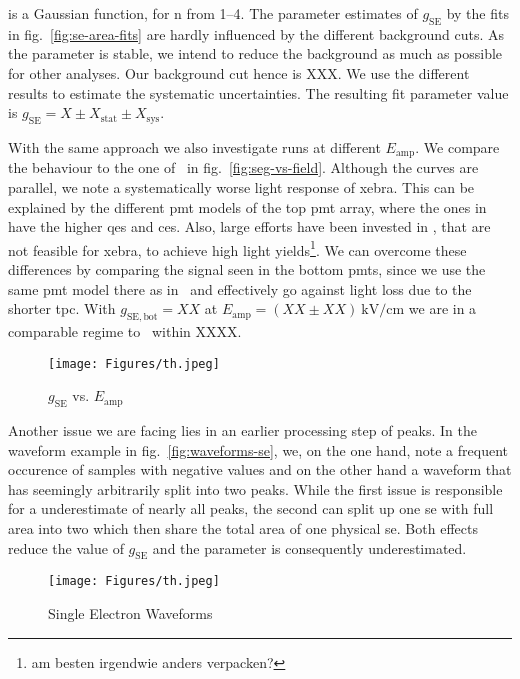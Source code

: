 is a Gaussian function, for n from \numrange{1}{4}.
The parameter estimates of $ g_\mathrm{SE} $ by the fits in fig.~\ref{fig:se-area-fits} are hardly influenced by the different background cuts.
As the parameter is stable, we intend to reduce the background as much as possible for other analyses.
Our background cut hence is XXX.  %
We use the different results to estimate the systematic uncertainties.
The resulting fit parameter value is $ g_\mathrm{SE} = X \pm X_\mathrm{stat} \pm X_\mathrm{sys} $.  %


With the same approach we also investigate runs at different $ E_\mathrm{amp} $.
We compare the behaviour to the one of \oneton~in fig.~\ref{fig:seg-vs-field}.
Although the curves are parallel, we note a systematically worse light response of \gls{xebra}.
This can be explained by the different \gls{pmt} models of the top \gls{pmt} array, where the ones in \oneton have the higher \glspl{qe} and \glspl{ce}.
Also, large efforts have been invested in \oneton, that are not feasible for \gls{xebra}, to achieve high light yields\footnote{am besten irgendwie anders verpacken?}.
We can overcome these differences by comparing the signal seen in the bottom \glspl{pmt}, since we use the same \gls{pmt} model there as in \oneton~and effectively go against light loss due to the shorter \gls{tpc}.
With $ g_\mathrm{SE, bot} = XX $ at $ E_\mathrm{amp} = \left( XX \pm XX \right) \SI{}{\kilo\volt\per\centi\meter} $ we are in a comparable regime to \oneton~within XXXX.  %


\begin{figure}
    \centering
    \texttt{[image: Figures/th.jpeg]}  %
    \caption[\oneton comparison of Amplification Gain vs. Fieldstrength]{
        $ g_\mathrm{SE} $ vs. $ E_\mathrm{amp} $
    }
\end{figure}
    \label{fig:seg-vs-field}


Another issue we are facing lies in an earlier processing step of peaks.
In the waveform example in fig.~\ref{fig:waveforms-se}, we, on the one hand, note a frequent occurence of samples with negative values and on the other hand a waveform that has seemingly arbitrarily split into two peaks.
While the first issue is responsible for a underestimate of nearly all peaks, the second can split up one \gls{se} with full area into two which then share the total area of one physical \gls{se}.
Both effects reduce the value of $ g_\mathrm{SE} $ and the parameter is consequently underestimated.


\begin{figure}
    \centering
    \texttt{[image: Figures/th.jpeg]}  %
    \caption[Single Electrons Waveforms]{
        Single Electron Waveforms
    }
\end{figure}


